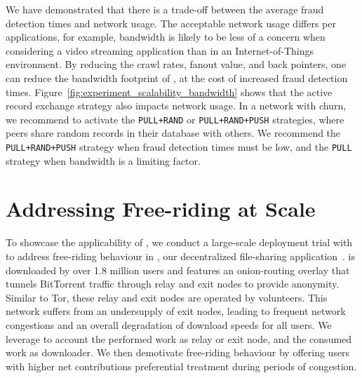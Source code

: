 We have demonstrated that there is a trade-off between the average fraud detection times and network usage.
The acceptable network usage differs per applications, for example, bandwidth is likely to be less of a concern when considering a video streaming application than in an Internet-of-Things environment.
By reducing the crawl rates, fanout value, and back pointers, one can reduce the bandwidth footprint of \ModelName{}, at the cost of increased fraud detection times.
Figure~\ref{fig:experiment_scalability_bandwidth} shows that the active record exchange strategy also impacts network usage.
In a network with churn, we recommend to activate the \texttt{PULL+RAND} or \texttt{PULL+RAND+PUSH} strategies, where peers share random records in their database with others.
We recommend the \texttt{PULL+RAND+PUSH} strategy when fraud detection times must be low, and the \texttt{PULL} strategy when bandwidth is a limiting factor.

\section{Addressing Free-riding at Scale}
\label{sec:deployment}
To showcase the applicability of \ModelName{}, we conduct a large-scale deployment trial with to address free-riding behaviour in \Tribler{}, our decentralized file-sharing application~\cite{pouwelse2008tribler}.
\Tribler{} is downloaded by over 1.8 million users and features an onion-routing overlay that tunnels BitTorrent traffic through relay and exit nodes to provide anonymity.
Similar to Tor, these relay and exit nodes are operated by volunteers.
This network suffers from an undersupply of exit nodes, leading to frequent network congestions and an overall degradation of download speeds for all users.
We leverage \ModelName{} to account the performed work as relay or exit node, and the consumed work as downloader.
We then demotivate free-riding behaviour by offering users with higher net contributions preferential treatment during periods of congestion.

